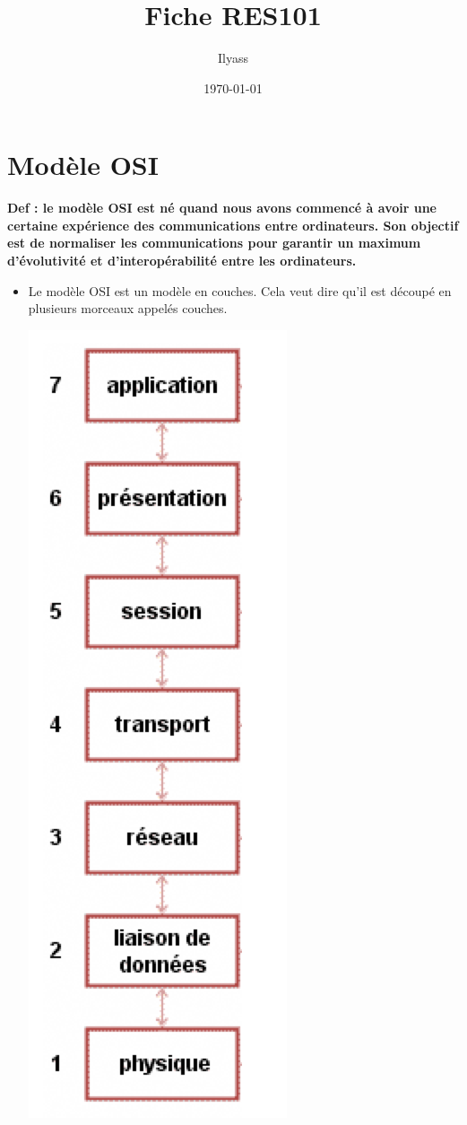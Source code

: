 \documentclass[a4paper,9pt, twocolumn]{article}
\title{\vspace{-1.2cm} Fiche RES101}
\date{\today}
\author{Ilyass \bsc{El Mansouri}}
\begin{document}
\maketitle

\section*{Modèle OSI}

	\textbf{Def : le modèle OSI est né quand nous avons commencé à avoir une certaine expérience des communications entre ordinateurs. Son objectif est de normaliser les communications pour garantir un maximum d'évolutivité et d'interopérabilité entre les ordinateurs.}
	
	\begin{itemize}
		\item Le modèle OSI est un modèle en couches. Cela veut dire qu'il est découpé en plusieurs morceaux appelés couches.
		\begin{center}
		\includegraphics[scale=0.4]{couches.png}

\end{center}
\end{itemize}
\end{document}
